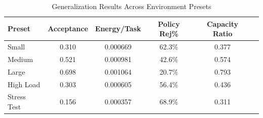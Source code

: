 \begin{table}[h]
\centering
\caption{Generalization Results Across Environment Presets}
\label{tab:generalization}
\begin{tabular}{lccccc}
\toprule
Preset & Acceptance & Energy/Task & Policy Rej\% & Capacity Ratio \\
\midrule
Small & 0.310 & 0.000669 & 62.3\% & 0.377 \\
Medium & 0.521 & 0.000981 & 42.6\% & 0.574 \\
Large & 0.698 & 0.001064 & 20.7\% & 0.793 \\
High Load & 0.303 & 0.000605 & 56.4\% & 0.436 \\
Stress Test & 0.156 & 0.000357 & 68.9\% & 0.311 \\
\bottomrule
\end{tabular}
\end{table}
